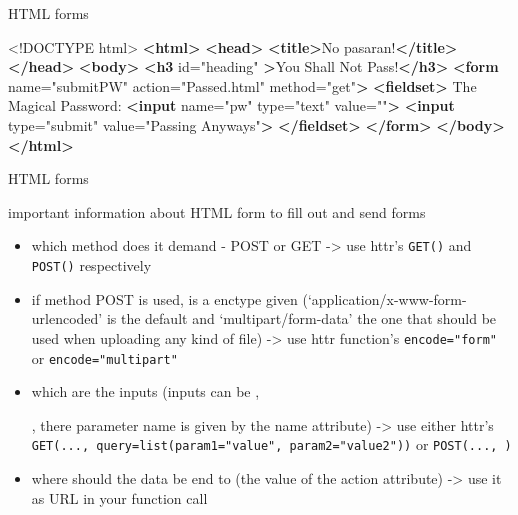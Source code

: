 \documentclass[ignorenonframetext,]{beamer}
\newenvironment{Shaded}{\begin{snugshade}}{\end{snugshade}}
\newcommand{\KeywordTok}[1]{\textcolor[rgb]{0.13,0.29,0.53}{\textbf{{#1}}}}
\newcommand{\DataTypeTok}[1]{\textcolor[rgb]{0.13,0.29,0.53}{{#1}}}
\newcommand{\StringTok}[1]{\textcolor[rgb]{0.31,0.60,0.02}{{#1}}}
\newcommand{\OtherTok}[1]{\textcolor[rgb]{0.56,0.35,0.01}{{#1}}}
\newcommand{\NormalTok}[1]{{#1}}
\providecommand{\tightlist}{%
  \setlength{\itemsep}{0pt}\setlength{\parskip}{0pt}}
\begin{document}
\begin{frame}[fragile]{HTML forms}

\begin{Shaded}
\begin{Highlighting}[]
\DataTypeTok{<!DOCTYPE }\NormalTok{html}\DataTypeTok{>}
\KeywordTok{<html>}
  \KeywordTok{<head>}
  \KeywordTok{<title>}\NormalTok{No pasaran!}\KeywordTok{</title>}
  \KeywordTok{</head>}
  \KeywordTok{<body>}
    \KeywordTok{<h3}\OtherTok{ id=}\StringTok{"heading"} \KeywordTok{>}\NormalTok{You Shall Not Pass!}\KeywordTok{</h3>}
    \KeywordTok{<form}\OtherTok{ name=}\StringTok{"submitPW"}\OtherTok{ action=}\StringTok{"Passed.html"}\OtherTok{ method=}\StringTok{"get"}\KeywordTok{>}
      \KeywordTok{<fieldset>}
        \NormalTok{The Magical Password: }
        \KeywordTok{<input}\OtherTok{ name=}\StringTok{"pw"}\OtherTok{ type=}\StringTok{"text"}\OtherTok{ value=}\StringTok{""}\KeywordTok{>}
        \KeywordTok{<input}\OtherTok{ type=}\StringTok{"submit"}\OtherTok{ value=}\StringTok{"Passing Anyways"}\KeywordTok{>}
      \KeywordTok{</fieldset>}
    \KeywordTok{</form>}
  \KeywordTok{</body>}
\KeywordTok{</html>}
\end{Highlighting}
\end{Shaded}

\end{frame}

\begin{frame}[fragile]{HTML forms}

important information about HTML form to fill out and send forms

\begin{itemize}
\tightlist
\item
  which method does it demand - POST or GET -\textgreater{} use httr's
  \texttt{GET()} and \texttt{POST()} respectively
\item
  if method POST is used, is a enctype given
  (`application/x-www-form-urlencoded' is the default and
  `multipart/form-data' the one that should be used when uploading any
  kind of file) -\textgreater{} use httr function's
  \texttt{encode="form"} or \texttt{encode="multipart"}
\item
  which are the inputs (inputs can be ,

  , there parameter name is given by the name attribute) -\textgreater{}
  use either httr's
  \texttt{GET(...,\ query=list(param1="value",\ param2="value2"))} or
  \texttt{POST(...,\ )}
\item
  where should the data be end to (the value of the action attribute)
  -\textgreater{} use it as URL in your function call
\end{itemize}

\end{frame}
\end{document}
